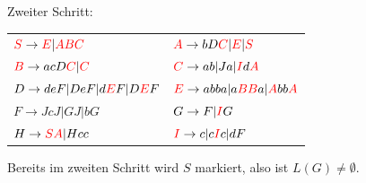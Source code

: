 \documentclass{article}
\begin{document}
\begin{center}
\begin{samepage}\clearpage
Zweiter Schritt:\\
\begin{tabular}{ll}
${\color{red}S} \rightarrow {\color{red}E} | {\color{red}ABC}$  & ${\color{red}A} \rightarrow bD{\color{red}C} | {\color{red}E} | {\color{red}S}$ \\
${\color{red}B} \rightarrow acD{\color{red}C} | {\color{red}C}$ & ${\color{red}C} \rightarrow ab | Ja | {\color{red}I}d{\color{red}A}$ \\
$D \rightarrow deF | DeF | d{\color{red}E}F | D{\color{red}E}F$ & ${\color{red}E} \rightarrow abba | a{\color{red}BB}a | {\color{red}A}bb{\color{red}A}$ \\
$F \rightarrow JcJ | GJ | bG$                                   & $G \rightarrow F | {\color{red}I}G$ \\
$H \rightarrow {\color{red}SA} | Hcc$                           & ${\color{red}I} \rightarrow c | c{\color{red}I}c | dF$
\end{tabular}
\end{samepage}
\end{center}
Bereits im zweiten Schritt wird $S$ markiert, also ist $L(G) \neq \emptyset$.
\end{document}
